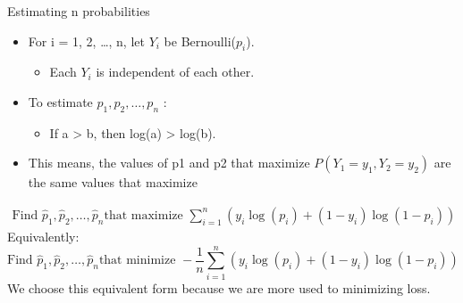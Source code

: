 \documentclass[aspectratio=169]{../latex_main/tntbeamer}  %
\begin{document}
	
	\begin{frame}{Estimating n probabilities}
	   \begin{itemize}
	       \item For i = 1, 2, …, n, let $Y_i$ be Bernoulli($p_i$).
	       \begin{itemize}
	           \item Each $Y_i$ is independent of each other.
	       \end{itemize}
	   \item To estimate          $p_1, p_2, \dots,p_n$                  :
	   \begin{itemize}
	       \item If a > b, then log(a) > log(b).
	   \end{itemize}
	   \item This means, the values of p1 and p2 that maximize      $P(Y_1 = y_1, Y_2 =y_2)$                           are the same values that maximize
	   \end{itemize}
	   \begin{align*}
	       \text{Find } \hat{p}_1, \hat{p}_2, \dots, \hat{p}_n\text{that maximize } \sum\limits_{i=1}^n(y_i\log(p_i) + (1 - y_i)\log(1-p_i))
	   \end{align*}
	   Equivalently:
	   \begin{equation*}
	       \text{Find } \hat{p}_1, \hat{p}_2, \dots, \hat{p}_n\text{that minimize } -\frac{1}{n}\sum\limits_{i=1}^n(y_i\log(p_i) + (1 - y_i)\log(1-p_i))
	   \end{equation*}
        We choose this equivalent form because we are more used to minimizing loss.

	\end{frame}
	
\end{document}
